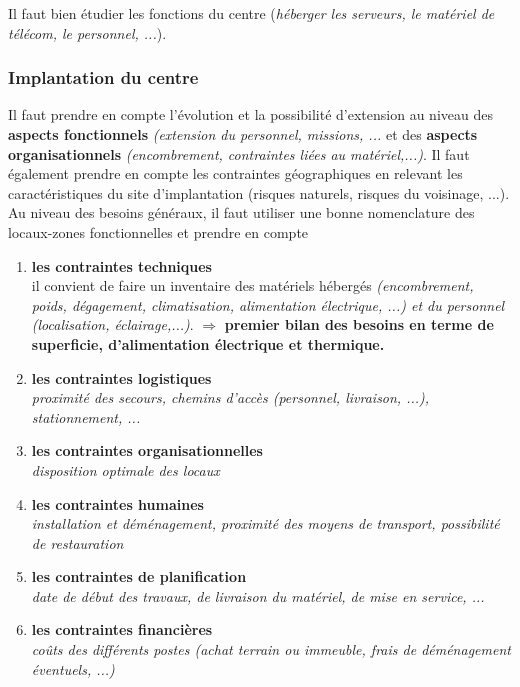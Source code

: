 \documentclass[10pt,a4paper,oneside,titlepage]{report}
\newcommand{\titre}[1]{\textcolor{title}{#1}}
\newcommand{\strong}[1]{\textbf{\titre{#1}}}
\begin{document}
Il faut bien étudier les fonctions du centre (\textit{héberger les serveurs, le matériel de télécom, le personnel, ...}).

\subsubsection{Implantation du centre}

Il faut prendre en compte l'évolution et la possibilité d'extension au niveau des \strong{aspects fonctionnels} \textit{(extension du personnel, missions, ...} et des \strong{aspects organisationnels} \textit{(encombrement, contraintes liées au
matériel,...)}. Il faut également prendre en compte les contraintes géographiques en relevant les caractéristiques du site d'implantation (risques naturels, risques du voisinage, ...). \\

Au niveau des besoins généraux, il faut utiliser une bonne nomenclature des locaux-zones fonctionnelles et prendre en compte
\begin{enumerate}
\item \strong{les contraintes techniques}\\
il convient de faire un inventaire des matériels hébergés  \textit{(encombrement, poids, dégagement, climatisation, alimentation électrique, ...) et du personnel \textit{(localisation, éclairage,...)}}. $\Rightarrow$ \strong{premier bilan des besoins
en terme de superficie, d'alimentation électrique et thermique.}
\item \strong{les contraintes logistiques}\\
\textit{proximité des secours, chemins d'accès (personnel, livraison, ...), stationnement, ...}
\item \strong{les contraintes organisationnelles}\\
\textit{disposition optimale des locaux}
\item \strong{les contraintes humaines}\\
\textit{installation et déménagement, proximité des moyens de transport, possibilité de restauration}
\item \strong{les contraintes de planification}\\
\textit{date de début des travaux, de livraison du matériel, de mise en service, ...}
\item \strong{les contraintes financières}\\
\textit{coûts des différents postes (achat terrain ou immeuble, frais de déménagement éventuels, ...)}
\end{enumerate}
\end{document}
